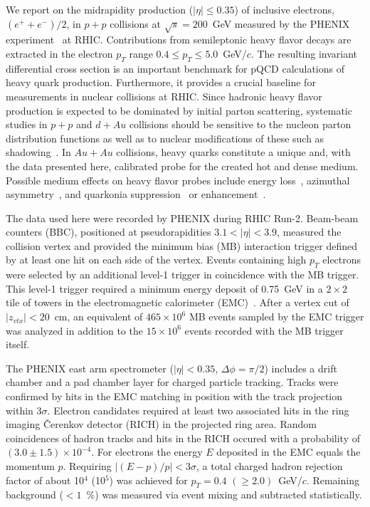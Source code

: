 \documentclass[aps,prl,superscriptaddress,showpacs,floatfix,twocolumn]{revtex4}
\begin{document}
We report on the midrapidity production ($|\eta| \le 0.35$) of inclusive 
electrons, $(e^+ + e^-)/2$, in $p + p$ collisions at $\sqrt{s} = 200$~GeV 
measured by the PHENIX experiment~\cite{phenix_nim} at RHIC. 
Contributions from semileptonic heavy flavor decays are extracted in the 
electron $p_T$ range $0.4 \le p_T \le 5.0$~GeV/$c$. 
The resulting invariant differential cross section is an important benchmark 
for pQCD calculations of heavy quark production. 
Furthermore, it provides a crucial baseline for measurements in nuclear 
collisions at RHIC.
Since hadronic heavy flavor production is expected to be dominated by 
initial parton scattering, systematic studies in $p + p$ and $d + Au$ 
collisions should be sensitive to the nucleon parton distribution functions 
as well as to nuclear modifications of these such as shadowing~\cite{lin96}. 
In $Au + Au$ collisions, heavy quarks constitute a unique and, with the data 
presented here, calibrated probe for the created hot and dense medium. 
Possible medium effects on heavy flavor probes include energy 
loss~\cite{dokshitzer01,armesto05}, azimuthal asymmetry~\cite{lin03greco04}, 
and quarkonia suppression~\cite{matsui86} or enhancement~\cite{pbm,thews}.

The data used here were recorded by PHENIX during RHIC Run-2. 
Beam-beam counters (BBC), positioned at pseudorapidities 
$3.1 < |\eta| < 3.9$, measured the collision vertex and provided the 
minimum bias (MB) interaction trigger defined by at least one hit on each side 
of the vertex. 
Events containing high $p_T$ electrons were selected by an additional level-1 
trigger in coincidence with the MB trigger. 
This level-1 trigger required a minimum energy deposit of 0.75~GeV in a 
$2 \times 2$ tile of towers in the electromagnetic calorimeter 
(EMC)~\cite{phenix_pi0pp}. 
After a vertex cut of $|z_{vtx}| < 20$~cm, an equivalent of 
$465 \times 10^6$ MB events sampled by the EMC trigger was analyzed in 
addition to the $15 \times 10^6$ events recorded with the MB trigger itself.

The PHENIX east arm spectrometer ($|\eta| < 0.35$, $\Delta \phi = \pi/2$)
includes a drift chamber and a pad chamber layer for charged particle 
tracking. 
Tracks were confirmed by hits in the EMC matching in position with the 
track projection within $3\sigma$. 
Electron candidates required at least two associated hits in the ring imaging 
\v{C}erenkov detector (RICH) in the projected ring area. 
Random coincidences of hadron tracks and hits in the RICH occured with a
probability of $(3.0\pm1.5) \times 10^{-4}$.
For electrons the energy $E$ deposited in the EMC equals the momentum $p$.
Requiring $|(E-p)/p| < 3\sigma$, a total charged hadron rejection factor of 
about 10$^4$ (10$^5$) was achieved for $p_T = 0.4$ $(\ge 2.0)$~GeV/$c$.
Remaining background ($<1$~\%) was measured via event mixing and subtracted 
statistically.
\end{document}

